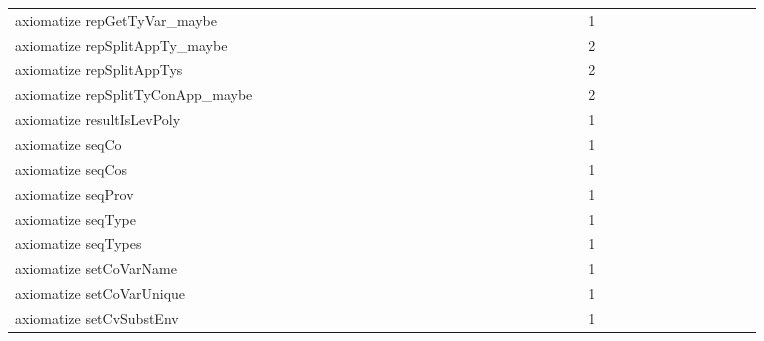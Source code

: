 {\begin{tabular}{l|rrr|rrr|rrr}
axiomatize repGetTyVar_maybe &  &  &  &  &  &  &  &  &  &  &  &  &  &  &  &  &  &  &  &  &  &  &  & 1 &  &  &  &  &  &  &  &  &  &  &  & \\
axiomatize repSplitAppTy_maybe &  &  &  &  &  &  &  &  &  &  &  &  &  &  &  &  &  &  &  &  &  &  &  & 2 &  &  &  &  &  &  &  &  &  &  &  & \\
axiomatize repSplitAppTys &  &  &  &  &  &  &  &  &  &  &  &  &  &  &  &  &  &  &  &  &  &  &  & 2 &  &  &  &  &  &  &  &  &  &  &  & \\
axiomatize repSplitTyConApp_maybe &  &  &  &  &  &  &  &  &  &  &  &  &  &  &  &  &  &  &  &  &  &  &  & 2 &  &  &  &  &  &  &  &  &  &  &  & \\
axiomatize resultIsLevPoly &  &  &  &  &  &  &  &  &  &  &  &  &  &  &  &  &  &  &  &  &  &  &  & 1 &  &  &  &  &  &  &  &  &  &  &  & \\
axiomatize seqCo &  &  &  &  &  &  &  &  &  &  &  &  &  &  &  &  &  &  &  &  &  &  &  & 1 &  &  &  &  &  &  &  &  &  &  &  & \\
axiomatize seqCos &  &  &  &  &  &  &  &  &  &  &  &  &  &  &  &  &  &  &  &  &  &  &  & 1 &  &  &  &  &  &  &  &  &  &  &  & \\
axiomatize seqProv &  &  &  &  &  &  &  &  &  &  &  &  &  &  &  &  &  &  &  &  &  &  &  & 1 &  &  &  &  &  &  &  &  &  &  &  & \\
axiomatize seqType &  &  &  &  &  &  &  &  &  &  &  &  &  &  &  &  &  &  &  &  &  &  &  & 1 &  &  &  &  &  &  &  &  &  &  &  & \\
axiomatize seqTypes &  &  &  &  &  &  &  &  &  &  &  &  &  &  &  &  &  &  &  &  &  &  &  & 1 &  &  &  &  &  &  &  &  &  &  &  & \\
axiomatize setCoVarName &  &  &  &  &  &  &  &  &  &  &  &  &  &  &  &  &  &  &  &  &  &  &  & 1 &  &  &  &  &  &  &  &  &  &  &  & \\
axiomatize setCoVarUnique &  &  &  &  &  &  &  &  &  &  &  &  &  &  &  &  &  &  &  &  &  &  &  & 1 &  &  &  &  &  &  &  &  &  &  &  & \\
axiomatize setCvSubstEnv &  &  &  &  &  &  &  &  &  &  &  &  &  &  &  &  &  &  &  &  &  &  &  & 1 &  &  &  &  &  &  &  &  &  &  &  & \\

\end{tabular}}
